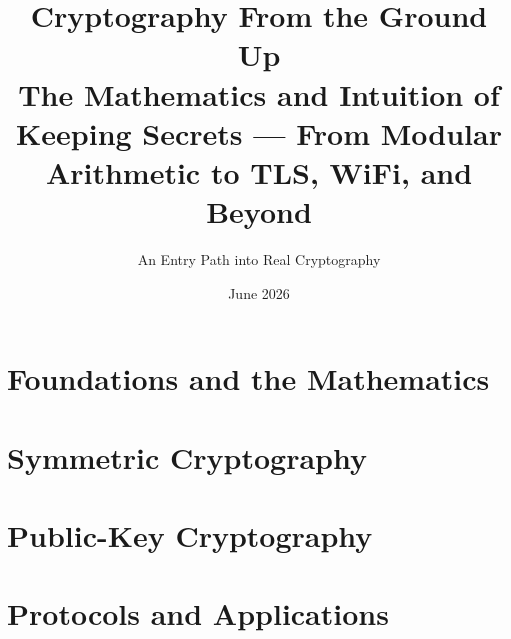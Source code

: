 \documentclass[11pt]{book}
\title{\textbf{Cryptography From the Ground Up}\\[0.4em]\large The Mathematics and Intuition of Keeping Secrets --- From Modular Arithmetic to TLS, WiFi, and Beyond}
\author{An Entry Path into Real Cryptography}
\date{June 2026}
\begin{document}
\frontmatter
\maketitle

\tableofcontents

\mainmatter

\part{Foundations and the Mathematics}









\part{Symmetric Cryptography}










\part{Public-Key Cryptography}







\part{Protocols and Applications}







\end{document}
